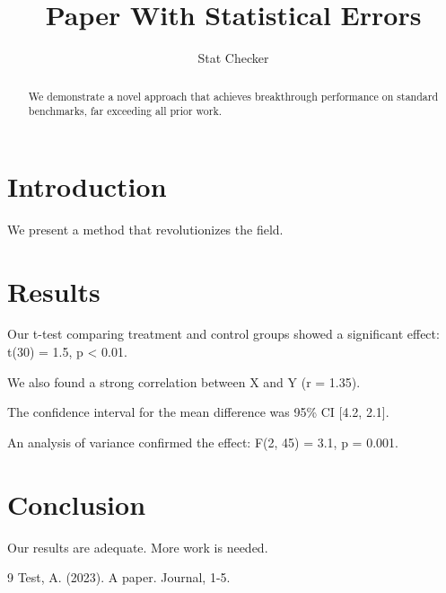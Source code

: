 \documentclass{article}
\title{Paper With Statistical Errors}
\author{Stat Checker}
\begin{document}
\maketitle

\begin{abstract}
We demonstrate a novel approach that achieves breakthrough performance
on standard benchmarks, far exceeding all prior work.
\end{abstract}

\section{Introduction}
\label{sec:intro}

We present a method that revolutionizes the field.

\section{Results}
\label{sec:results}

Our t-test comparing treatment and control groups showed a significant
effect: t(30) = 1.5, p < 0.01.

We also found a strong correlation between X and Y (r = 1.35).

The confidence interval for the mean difference was 95\% CI [4.2, 2.1].

An analysis of variance confirmed the effect: F(2, 45) = 3.1, p = 0.001.

\section{Conclusion}
\label{sec:conclusion}

Our results are adequate. More work is needed.

\begin{thebibliography}{9}
 Test, A. (2023). A paper. Journal, 1-5.
\end{thebibliography}
\end{document}
